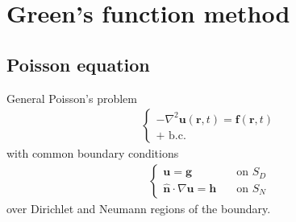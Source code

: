 \documentclass[letterpaper,10pt,italian]{jupyterBook}
\begin{document}
\chapter{Green’s function method}
\label{\detokenize{ch/green-function:green-s-function-method}}\label{\detokenize{ch/green-function:classical-electromagnetism-green-function}}\label{\detokenize{ch/green-function::doc}}

\section{Poisson equation}
\label{\detokenize{ch/green-function:poisson-equation}}
\sphinxAtStartPar
General Poisson’s problem
\begin{equation*}
\begin{split}\begin{cases}
  - \nabla^2 \mathbf{u}(\mathbf{r}, t) = \mathbf{f}(\mathbf{r},t) \\
  \text{+ b.c.}
\end{cases}\end{split}
\end{equation*}
\sphinxAtStartPar
with common boundary conditions
\begin{equation*}
\begin{split}\begin{cases}
\mathbf{u} = \mathbf{g} & \quad \text{on $S_D$} \\
\hat{\mathbf{n}} \cdot \nabla \mathbf{u} = \mathbf{h} & \quad \text{on $S_N$}
\end{cases}\end{split}
\end{equation*}
\sphinxAtStartPar
over Dirichlet and Neumann regions of the boundary.
\end{document}
